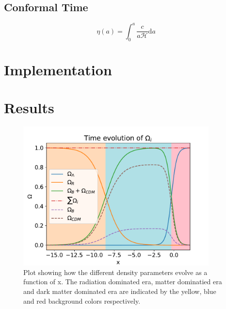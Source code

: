 \documentclass[12pt]{article}
\begin{document}
\subsection{Conformal Time}

\begin{equation}\label{eq:Conformal time integral}
    \eta(a) = \int_0^a \frac{c}{a\mathcal{H}}\textrm{d}a
\end{equation}





\section{Implementation}

\section{Results}

\begin{figure}[h]
    \centering
    \includegraphics[width=0.9\textwidth]{omega_plot.pdf}
    \caption{Plot showing how the different density parameters evolve as a function of x. The radiation dominated era, matter dominatied era and dark matter dominated era are indicated by the yellow, blue and red background colors respectively.}
    \label{fig:omega}
\end{figure}
\end{document}
